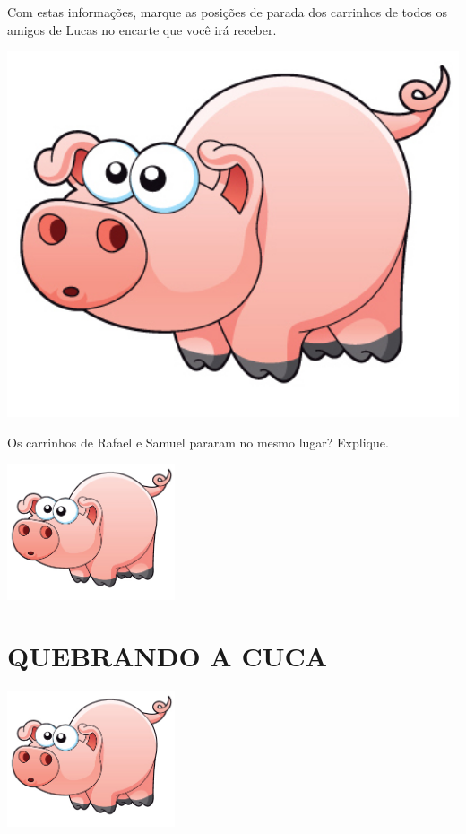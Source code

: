\documentclass[a4,12pt]{book}
\begin{document}
Com estas informações, marque as posições de parada dos carrinhos de todos os amigos de Lucas no encarte que você irá receber.

\includegraphics[width=600pt, keepaspectratio]{pig}

Os carrinhos de Rafael e Samuel pararam no mesmo lugar? Explique.















\includegraphics[width=\textwidth,height=4cm, keepaspectratio]{pig}
\section*{ QUEBRANDO A CUCA }



\includegraphics[width=\textwidth,height=4cm, keepaspectratio]{pig}
\end{document}

